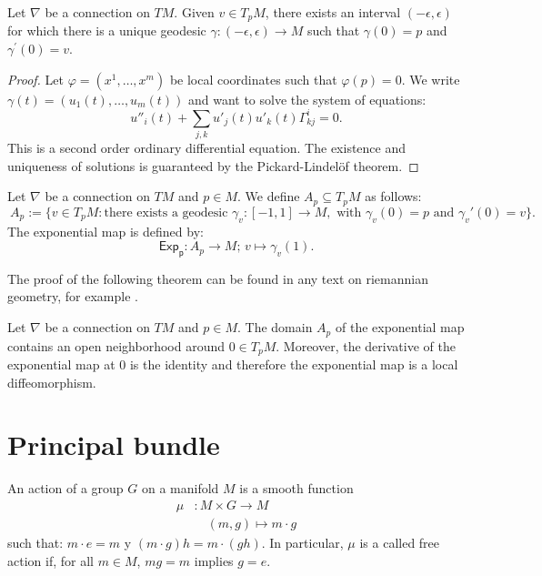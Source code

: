\begin{theorem}
	Let $\nabla$ be a connection on $TM$. Given $v\in T_{p}M$, there
	exists an interval $\left(  -\epsilon,\epsilon\right)  $ for which there is a
	unique geodesic $\gamma:\left(  -\epsilon,\epsilon\right)  \rightarrow M$ such
	that $\gamma\left(  0\right)  =p$ and $\gamma^{\prime}(0)=v$.
\end{theorem}

\begin{proof}
	Let $\varphi =(x^1,\dots, x^m)$  be local coordinates such that $\varphi(p)=0$. We  write $\gamma(t)=(u_1(t),\dots,u_m(t))$ and want to solve the system of equations:
	\[ u''_i(t) + \sum_{j,k} u'_j(t) u'_k(t) \Gamma_{kj}^i  =0.\]
	This is a second order ordinary differential equation. The existence and uniqueness of solutions is guaranteed by the Pickard-Lindel\"of theorem.
\end{proof}


\begin{definition}
	Let $\nabla$ be a connection on $TM$ and $ p \in M$. We define $A_p \subseteq T_pM$ as follows:
	\[\ A_p:= \{ v\in T_pM: \text{there exists a geodesic } \gamma_v: [-1,1] \rightarrow M, \text{ with } \gamma_v(0)=p \text{ and }  \gamma_v'(0)=v\}.\]
	The exponential map is defined by:
	\[ \mathsf{Exp_p}: A_p \rightarrow M; \, v \mapsto \gamma_v(1).\]
\end{definition}
The proof of the following theorem can be found in any text on riemannian geometry, for example \cite{riemannian}.
\begin{theorem}
	Let $\nabla$ be a connection on $TM$ and $ p \in M$. The domain $A_p$ of the exponential map contains an open
	neighborhood around $0 \in T_pM$. Moreover, the derivative of the exponential map at $0$ is the identity and therefore the exponential map is a local diffeomorphism.
\end{theorem}


\section{Principal bundle}
	\begin{definition}
	An action of a group  $G$ on a manifold  $M$ is a smooth function 
	\begin{align*}
	\mu &: M \times G  \longrightarrow M \\
	&\quad (m,g) \longmapsto m\cdot g
	\end{align*}
	such that:
	$m \cdot e=m$ y $(m \cdot g)h=m\cdot(gh)$. In particular, $\mu$ is a called free action if, for all $m\in M$, $mg=m$ implies $g=e$.
\end{definition}


